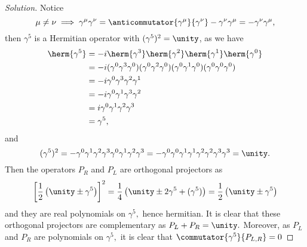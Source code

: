 \begin{proof}[Solution]
   Notice 
   \begin{equation*}
      \mu \neq \nu \implies \gamma^\mu \gamma^\nu = \anticommutator{\gamma^\mu}{\gamma^\nu} - \gamma^\nu \gamma^\mu = - \gamma^\nu \gamma^\mu,
   \end{equation*}
   then \(\gamma^5\) is a Hermitian operator with \((\gamma^5)^2 = \unity\), as we have
   \begin{align*}
      \herm{\gamma^5} &= -i \herm{\gamma^3} \herm{\gamma^2} \herm{\gamma^1} \herm{\gamma^0} \\
                      &= -i (\gamma^0 \gamma^3 \gamma^0) (\gamma^0 \gamma^2 \gamma^0) (\gamma^0 \gamma^1 \gamma^0) (\gamma^0 \gamma^0 \gamma^0) \\
                      &= -i \gamma^0\gamma^3 \gamma^2 \gamma^1 \\
                      &= -i \gamma^0 \gamma^1 \gamma^3 \gamma^2 \\
                      &= i \gamma^0 \gamma^1 \gamma^2 \gamma^3 \\
                      &= \gamma^5,
   \end{align*}
   and
   \begin{equation*}
      (\gamma^5)^2 = - \gamma^0 \gamma^1 \gamma^2 \gamma^3 \gamma^0 \gamma^1 \gamma^2 \gamma^3 = - \gamma^0 \gamma^0 \gamma^1 \gamma^1 \gamma^2 \gamma^2 \gamma^3 \gamma^3 = \unity.
   \end{equation*}
   Then the operators \(P_R\) and \(P_L\) are orthogonal projectors as
   \begin{equation*}
      \left[\frac12 \left(\unity \pm \gamma^5\right)\right]^2 = \frac14 \left(\unity \pm 2 \gamma^5 + (\gamma^5)\right) = \frac12 \left(\unity \pm \gamma^5\right)
   \end{equation*}
   and they are real polynomials on \(\gamma^5,\) hence hermitian. It is clear that these orthogonal projectors are complementary as \(P_L + P_R = \unity.\) Moreover, as \(P_L\) and \(P_R\) are polynomials on \(\gamma^5,\) it is clear that \(\commutator{\gamma^5}{P_{L,R}} = 0\)



\end{proof}
